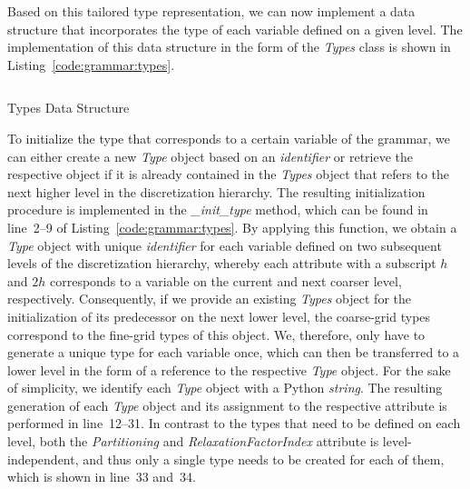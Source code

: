 Based on this tailored type representation, we can now implement a data structure that incorporates the type of each variable defined on a given level.
The implementation of this data structure in the form of the \emph{Types} class is shown in Listing~\ref{code:grammar:types}.
\begin{listing}
  	\inputminted[linenos]{python}{evostencils/grammar/types.py}
  	\caption{Types Data Structure}
  	\label{code:grammar:types}
\end{listing}
To initialize the type that corresponds to a certain variable of the grammar, we can either create a new \emph{Type} object based on an \emph{identifier} or retrieve the respective object if it is already contained in the \emph{Types} object that refers to the next higher level in the discretization hierarchy.
The resulting initialization procedure is implemented in the \emph{\_init\_type} method, which can be found in line~2--9 of Listing~\ref{code:grammar:types}.
By applying this function, we obtain a \emph{Type} object with unique \emph{identifier} for each variable defined on two subsequent levels of the discretization hierarchy, whereby each attribute with a subscript $h$ and $2h$ corresponds to a variable on the current and next coarser level, respectively.
Consequently, if we provide an existing \emph{Types} object for the initialization of its predecessor on the next lower level, the coarse-grid types correspond to the fine-grid types of this object.
We, therefore, only have to generate a unique type for each variable once, which can then be transferred to a lower level in the form of a reference to the respective \emph{Type} object.
For the sake of simplicity, we identify each \emph{Type} object with a Python \emph{string}. 
The resulting generation of each \emph{Type} object and its assignment to the respective attribute is performed in line~12--31.
In contrast to the types that need to be defined on each level, both the \emph{Partitioning} and \emph{RelaxationFactorIndex} attribute is level-independent, and thus only a single type needs to be created for each of them, which is shown in line~33 and~34.


